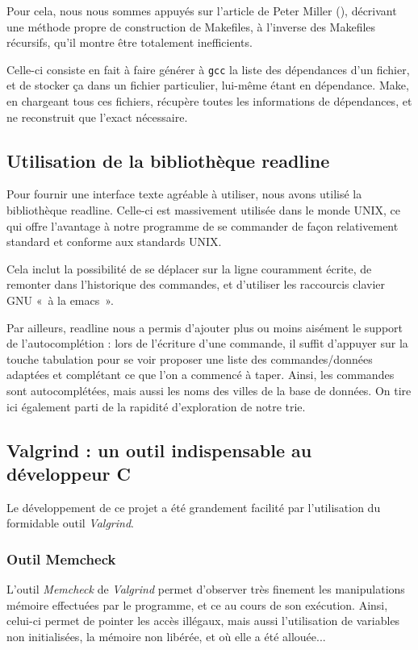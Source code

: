 \documentclass[a4paper]{article}
\begin{document}
Pour cela, nous nous sommes appuyés sur l'article de Peter Miller (\cite{makefile}), décrivant une méthode propre de construction de Makefiles, à l'inverse des Makefiles récursifs, qu'il montre être totalement inefficients.

Celle-ci consiste en fait à faire générer à \texttt{gcc} la liste des dépendances d'un fichier, et de stocker ça dans un fichier particulier, lui-même étant en dépendance. Make, en chargeant tous ces fichiers, récupère toutes les informations de dépendances, et ne reconstruit que l'exact nécessaire.

\subsection{Utilisation de la bibliothèque readline}
Pour fournir une interface texte agréable à utiliser, nous avons utilisé la bibliothèque readline. Celle-ci est massivement utilisée dans le monde UNIX, ce qui offre l'avantage à notre programme de se commander de façon relativement standard et conforme aux standards UNIX.

Cela inclut la possibilité de se déplacer sur la ligne couramment écrite, de remonter dans l'historique des commandes, et d'utiliser les raccourcis clavier GNU «~à la emacs~».

Par ailleurs, readline nous a permis d'ajouter plus ou moins aisément le support de l'autocomplétion : lors de l'écriture d'une commande, il suffit d'appuyer sur la touche tabulation pour se voir proposer une liste des commandes/données adaptées et complétant ce que l'on a commencé à taper. Ainsi, les commandes sont autocomplétées, mais aussi les noms des villes de la base de données. On tire ici également parti de la rapidité d'exploration de notre trie.

\subsection{Valgrind : un outil indispensable au développeur C}
Le développement de ce projet a été grandement facilité par l'utilisation du formidable outil \emph{Valgrind}.

\subsubsection{Outil Memcheck}
L'outil \emph{Memcheck} de \emph{Valgrind} permet d'observer très finement les manipulations mémoire effectuées par le programme, et ce au cours de son exécution. Ainsi, celui-ci permet de pointer les accès illégaux, mais aussi l'utilisation de variables non initialisées, la mémoire non libérée, et où elle a été allouée...
\end{document}
